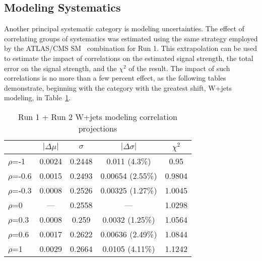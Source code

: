 \subsection{Modeling Systematics}
\label{sec:model}
Another principal systematic category is modeling uncertainties.  The effect of correlating groups of systematics was estimated using the same strategy employed by the ATLAS/CMS SM \vhbb\, combination for Run 1.  This extrapolation can be used to estimate the impact of correlations on the estimated signal strength, the total error on the signal strength, and the $\chi^2$ of the result.  The impact of such correlations is no more than a few percent effect, as the following tables demonstrate, beginning with the category with the greatest shift, W+jets modeling, in Table~\ref{tab:wjets_correlation}.

\begin{table}[!htbp]\captionsetup{justification=centering}
\begin{center}\begin{tabular}{lcccc}
\hline\hline
 & $\left|\Delta\mu\right|$ & $\sigma$ & $\left|\Delta\sigma\right|$ & $\chi^2$\\
\hline
$\rho$=-1 & 0.0024 & 0.2448 & 0.011 (4.3\%) & 0.95\\
$\rho$=-0.6 & 0.0015 & 0.2493 & 0.00654 (2.55\%) & 0.9804\\
$\rho$=-0.3 & 0.0008 & 0.2526 & 0.00325 (1.27\%) & 1.0045\\
$\rho$=0 & --- & 0.2558 & --- & 1.0298\\
$\rho$=0.3 & 0.0008 & 0.259 & 0.0032 (1.25\%) & 1.0564\\
$\rho$=0.6 & 0.0017 & 0.2622 & 0.00636 (2.49\%) & 1.0844\\
$\rho$=1 & 0.0029 & 0.2664 & 0.0105 (4.11\%) & 1.1242\\
\hline\hline
\end{tabular}
\caption{Run 1 + Run 2 W+jets modeling correlation projections}
\label{tab:wjets_correlation}
\end{center}
\end{table}

